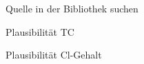 Quelle in der Bibliothek suchen

Plausibilität TC

Plausibilität Cl-Gehalt\\

%

\nocite{ersatzbrennstoffe,PolymerServiceGmbHMerseburg.13.08.2019,Wikipedia.21.11.2019,Skript}